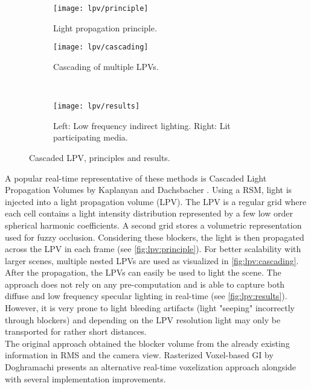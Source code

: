 \documentclass[thesis.tex]{subfiles}
\begin{document}
\begin{figure}[h]
\centering
\begin{subfigure}[b]{0.35\textwidth}
\centering
\texttt{[image: lpv/principle]}
\caption{Light propagation principle.}
\label{fig:lpv:principle}
\end{subfigure}
\begin{subfigure}[b]{0.53\textwidth}
\centering
\texttt{[image: lpv/cascading]}
\caption{Cascading of multiple LPVs.}
\label{fig:lpv:cascading}
\end{subfigure}
\\
\begin{subfigure}[b]{\textwidth}
\centering
\texttt{[image: lpv/results]}
\caption{Left: Low frequency indirect lighting. Right: Lit participating media.}
\label{fig:lpv:results}
\end{subfigure}
\caption{\cite{bib:lpt} Cascaded LPV, principles and results.}
\end{figure}
A popular real-time representative of these methods is Cascaded Light Propagation Volumes by Kaplanyan and Dachsbacher \cite{bib:lpt}.
Using a RSM, light is injected into a light propagation volume (LPV).
The LPV is a regular grid where each cell contains a light intensity distribution represented by a few low order spherical harmonic coefficients.
A second grid stores a volumetric representation used for fuzzy occlusion.
Considering these blockers, the light is then propagated across the LPV in each frame (see \autoref{fig:lpv:principle}).
For better scalability with larger scenes, multiple nested LPVs are used as visualized in \autoref{fig:lpv:cascading}.
After the propagation, the LPVs can easily be used to light the scene.
The approach does not rely on any pre-computation and is able to capture both diffuse and low frequency specular lighting in real-time (see \autoref{fig:lpv:results}).
However, it is very prone to light bleeding artifacts (light "seeping" incorrectly through blockers) and depending on the LPV resolution light may only be transported for rather short distances.
\\
The original approach obtained the blocker volume from the already existing information in RMS and the camera view.
Rasterized Voxel-based GI by Doghramachi \cite{bib:rasterizedvbgi} presents an alternative real-time voxelization approach alongside with several implementation improvements.
\end{document}
